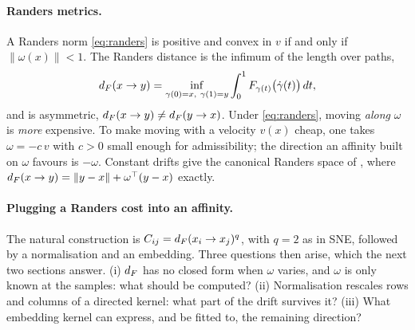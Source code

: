 \paragraph{Randers metrics.}
A Randers norm \eqref{eq:randers} is positive and convex in $v$ if and
only if $\|\omega(x)\|<1$. The Randers distance is the infimum of the
length over paths,
\begin{equation}
  \dF(x\to y)=\inf_{\gamma(0)=x,\ \gamma(1)=y}\int_0^1 F_{\gamma(t)}\big(\dot\gamma(t)\big)\,dt ,
  \label{eq:dF}
\end{equation}
and is asymmetric, $d_F(x\to y)\neq d_F(y\to x)$. Under
\eqref{eq:randers}, moving \emph{along} $\omega$ is \emph{more}
expensive. To make moving with a velocity $v(x)$ cheap, one takes
$\omega=-c\,v$ with $c>0$ small enough for admissibility; the direction
an affinity built on $\omega$ favours is $-\omega$. Constant drifts give
the canonical Randers space of \citet{dages2025finsler}, where
$d_F(x\to y)=\|y-x\|+\omega^\top(y-x)$ exactly.

\paragraph{Plugging a Randers cost into an affinity.}
The natural construction is $C_{ij}=d_F(x_i\to x_j)^q$, with $q=2$ as in
SNE, followed by a normalisation and an embedding. Three questions then
arise, which the next two sections answer. (i) $d_F$ has no closed form
when $\omega$ varies, and $\omega$ is only known at the samples: what
should be computed? (ii) Normalisation rescales rows and columns of a
directed kernel: what part of the drift survives it? (iii) What
embedding kernel can express, and be fitted to, the remaining direction?

